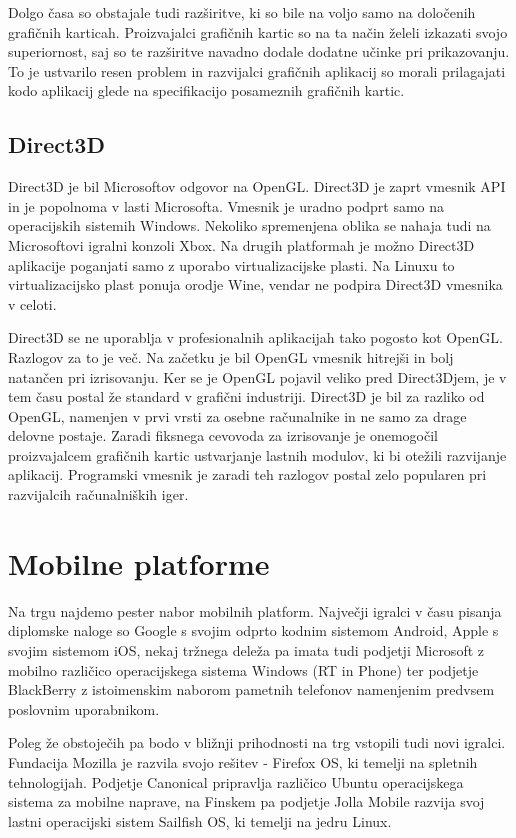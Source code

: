 Dolgo časa so obstajale tudi razširitve, ki so bile na voljo samo na določenih grafičnih karticah. Proizvajalci grafičnih kartic so na ta način želeli izkazati svojo superiornost, saj so te razširitve navadno dodale dodatne učinke pri prikazovanju. To je ustvarilo resen problem in razvijalci grafičnih aplikacij so morali prilagajati kodo aplikacij glede na specifikacijo posameznih grafičnih kartic.

\subsection{Direct3D}

Direct3D \cite{direct3d} je bil Microsoftov odgovor na OpenGL. Direct3D je zaprt vmesnik API in je popolnoma v lasti Microsofta. Vmesnik je uradno podprt samo na operacijskih sistemih Windows. Nekoliko spremenjena oblika se nahaja tudi na Microsoftovi igralni konzoli Xbox. Na drugih platformah je možno Direct3D aplikacije poganjati samo z uporabo virtualizacijske plasti. Na Linuxu to virtualizacijsko plast ponuja orodje Wine, vendar ne podpira Direct3D vmesnika v celoti.

Direct3D se ne uporablja v profesionalnih aplikacijah tako pogosto kot OpenGL. Razlogov za to je več. Na začetku je bil OpenGL vmesnik hitrejši in bolj natančen pri izrisovanju. Ker se je OpenGL pojavil veliko pred Direct3Djem, je v tem času postal že standard v grafični industriji. Direct3D je bil za razliko od OpenGL, namenjen v prvi vrsti za osebne računalnike in ne samo za drage delovne postaje. Zaradi fiksnega cevovoda za izrisovanje je onemogočil proizvajalcem grafičnih kartic ustvarjanje lastnih modulov, ki bi otežili razvijanje aplikacij. Programski vmesnik je zaradi teh razlogov postal zelo popularen pri razvijalcih računalniških iger.

\section{Mobilne platforme} 

Na trgu najdemo pester nabor mobilnih platform. Največji igralci v času pisanja diplomske naloge so Google s svojim odprto kodnim sistemom Android, Apple s svojim sistemom iOS, nekaj tržnega deleža pa imata tudi podjetji Microsoft z mobilno različico operacijskega sistema Windows (RT in Phone) ter podjetje BlackBerry z istoimenskim naborom pametnih telefonov namenjenim predvsem poslovnim uporabnikom.

Poleg že obstoječih pa bodo v bližnji prihodnosti na trg vstopili tudi novi igralci. Fundacija Mozilla je razvila svojo rešitev - Firefox OS, ki temelji na spletnih tehnologijah. Podjetje Canonical pripravlja različico Ubuntu operacijskega sistema za  mobilne naprave, na Finskem pa podjetje Jolla Mobile razvija svoj lastni operacijski sistem Sailfish OS, ki temelji na jedru Linux.

